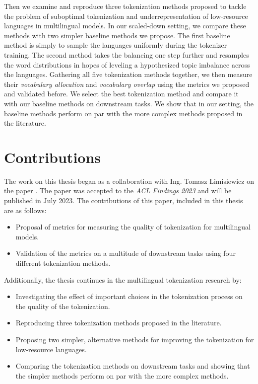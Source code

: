 Then we examine and reproduce three tokenization methods \citep{chung_improving_2020,zheng_allocating_2021,liang_xlm-v_2023} proposed to tackle the problem of suboptimal tokenization and underrepresentation of low-resource languages in multilingual models.  In our scaled-down setting, we compare these methods with two simpler baseline methods we propose. The first baseline method  is simply to sample the languages uniformly during the tokenizer training. The second method  takes the balancing one step further and resamples the word distributions in hopes of leveling a hypothesized topic imbalance across the languages. 
Gathering all five tokenization methods together, we then measure their \textit{vocabulary allocation} and \textit{vocabulary overlap} using the metrics we proposed and validated before. We select the best tokenization method and compare it with our baseline methods on downstream tasks. We show that in our setting, the baseline methods perform on par with the more complex methods proposed in the literature.


\section{Contributions}

The work on this thesis began as a collaboration with Ing. Tomasz Limisiewicz on the paper . The paper was accepted to the \textit{ACL Findings 2023} and will be published in July 2023. The contributions of this paper, included in this thesis are as follows:

\begin{itemize}
    \item Proposal of metrics for measuring the quality of tokenization for multilingual models.
    \item Validation of the metrics on a multitude of downstream tasks using four different tokenization methods.
\end{itemize}

Additionally, the thesis continues in the multilingual tokenization research by:

\begin{itemize}
    \item Investigating the effect of important choices in the tokenization process on the quality of the tokenization.
    \item Reproducing three tokenization methods proposed in the literature.
    \item Proposing two simpler, alternative methods for improving the tokenization for low-resource languages.
    \item Comparing the tokenization methods on downstream tasks and showing that the simpler methods perform on par with the more complex methods.
\end{itemize}


